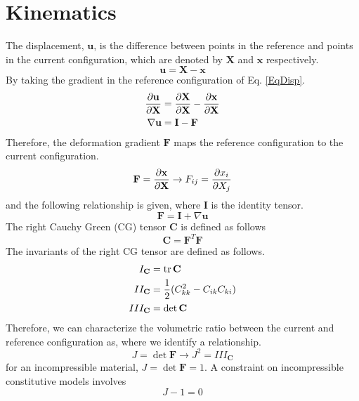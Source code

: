 \documentclass[12pt,3p]{article}
\begin{document}
\section{Kinematics}
\vspace{-2ex}
The displacement, $\mathbf{u}$, is the difference between points in the reference and points in the current configuration, which are denoted by $\mathbf{X}$ and $\mathbf{x}$ respectively. 
\begin{equation}\label{EqDisp}
\mathbf{u} = \mathbf{X} - \mathbf{x}
\end{equation}
By taking the gradient in the reference configuration of Eq. \ref{EqDisp}.
\begin{align*}
\pdv{\mathbf{u}}{\mathbf{X}} 
	&= \pdv{\mathbf{X}}{\mathbf{X}} - \pdv{\mathbf{x}}{\mathbf{X}} \\
\nabla \mathbf{u}
	&= \mathbf{I} - \mathbf{F}
\end{align*}
Therefore, the deformation gradient $\mathbf{F}$ maps the reference configuration to the current configuration. 
\begin{equation}\label{EqDefGrad}
\mathbf{F} = \pdv{\mathbf{x}}{\mathbf{X}} \rightarrow F_{ij} = \pdv{x_i}{X_j}
\end{equation}
and the following relationship is given, where $\mathbf{I}$ is the identity tensor. 
\begin{equation}\label{EqDefGrad2}
\mathbf{F} = \mathbf{I} + \nabla \mathbf{u} 
\end{equation}
The right Cauchy Green (CG) tensor $\mathbf{C}$ is defined as follows
\begin{equation}\label{EqRightCG}
\mathbf{C} = \mathbf{F}^T \mathbf{F}
\end{equation}
The invariants of the right CG tensor are defined as follows.
\begin{align*}
I_\mathbf{C} &= \tr \mathbf{C} \\
II_\mathbf{C} &= \frac{1}{2} (C_{kk}^2 - C_{ik} C_{ki}) \\
III_\mathbf{C} &= \det \mathbf{C} 
\end{align*}
Therefore, we can characterize the volumetric ratio between the current and reference configuration as, where we identify a relationship. 
\begin{equation}
J = \det \mathbf{F} \rightarrow J^2 = III_\mathbf{C}
\end{equation}
for an incompressible material, $J = \det \mathbf{F} = 1$. A constraint on incompressible constitutive models involves
\begin{equation}\label{EqIncompCon}
J-1 = 0
\end{equation}
\end{document}
